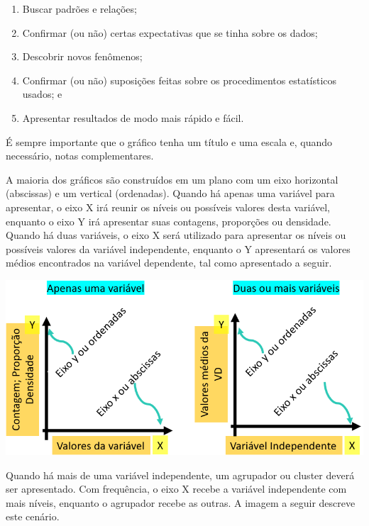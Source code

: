 \documentclass[
]{book}
\providecommand{\tightlist}{%
  \setlength{\itemsep}{0pt}\setlength{\parskip}{0pt}}
\begin{document}
\begin{enumerate}
\def\labelenumi{(\alph{enumi})}
\tightlist
\item
  Buscar padrões e relações;\\
\item
  Confirmar (ou não) certas expectativas que se tinha sobre os dados;\\
\item
  Descobrir novos fenômenos;\\
\item
  Confirmar (ou não) suposições feitas sobre os procedimentos estatísticos usados; e\\
\item
  Apresentar resultados de modo mais rápido e fácil.
\end{enumerate}

É sempre importante que o gráfico tenha um título e uma escala e, quando necessário, notas complementares.

A maioria dos gráficos são construídos em um plano com um eixo horizontal (abscissas) e um vertical (ordenadas). Quando há apenas uma variável para apresentar, o eixo X irá reunir os níveis ou possíveis valores desta variável, enquanto o eixo Y irá apresentar suas contagens, proporções ou densidade. Quando há duas variáveis, o eixo X será utilizado para apresentar os níveis ou possíveis valores da variável independente, enquanto o Y apresentará os valores médios encontrados na variável dependente, tal como apresentado a seguir.

\includegraphics{./img/cap_grafico_tutorial.png}

Quando há mais de uma variável independente, um agrupador ou cluster deverá ser apresentado. Com frequência, o eixo X recebe a variável independente com mais níveis, enquanto o agrupador recebe as outras. A imagem a seguir descreve este cenário.
\end{document}
